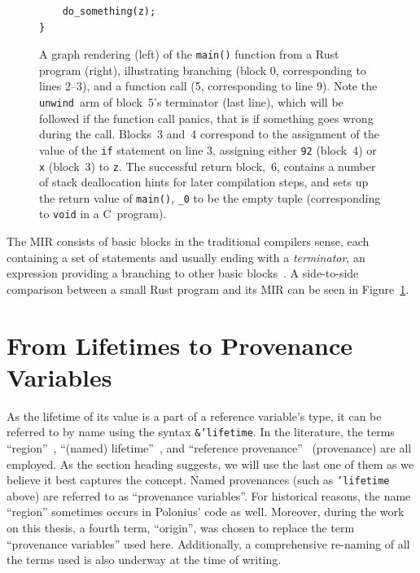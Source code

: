 \documentclass[11pt,a4paper,twoside,openany,draft]{report}
\newenvironment{sourcecode}{\captionsetup{type=listing}}{}
\newcommand{\InRust}[1]{\texttt{#1}}
\begin{document}
\begin{figure}
\begin{minipage}{.5\textwidth}
\begin{sourcecode}
\begin{verbatim}
    do_something(z);
}
\end{verbatim}
\end{sourcecode}
\end{minipage}
\caption[MIR of a Small Rust Program With Function Call]{A graph rendering
  (left) of the \InRust{main()} function from a Rust program (right),
  illustrating branching (block 0, corresponding to lines 2--3), and a function
  call (5, corresponding to line 9). Note the \texttt{unwind}~arm of block~5's
  terminator (last line), which will be followed if the function call panics,
  that is if something goes wrong during the call. Blocks~3 and~4 correspond to
  the assignment of the value of the \InRust{if} statement on line 3, assigning
  either \InRust{92} (block~4) or \InRust{x} (block~3) to \InRust{z}. The
  successful return block,~6, contains a number of stack deallocation hints for
  later compilation steps, and sets up the return value of \InRust{main()},
  \InRust{_0} to be the empty tuple (corresponding to \texttt{void} in a
  C~program).}
  \label{fig:mir-example}
\end{figure}

The MIR consists of basic blocks in the traditional compilers sense, each
containing a set of statements and usually ending with a \emph{terminator}, an
expression providing a branching to other basic blocks~\cite{mir_rfc}. A
side-to-side comparison between a small Rust program and its MIR can be seen in
Figure~\ref{fig:mir-example}.

\section{From Lifetimes to Provenance Variables}
\label{sec:reference-provenance}

As the lifetime of its value is a part of a reference variable's type, it can be
referred to by name using the syntax \InRust{&'lifetime}. In the literature, the
terms ``region''~\cite{matsakis_alias-based_2018}, ``(named)
lifetime''~\nocite{noauthor_rfc_2019}, and ``reference
provenance''~\cite{weiss_oxide:_2019} (provenance) are all employed. As the
section heading suggests, we will use the last one of them as we believe it best
captures the concept. Named provenances (such as \InRust{'lifetime} above) are
referred to as ``provenance variables''. For historical reasons, the name
``region'' sometimes occurs in Polonius' code as well. Moreover, during the work
on this thesis, a fourth term, ``origin'', was chosen to replace the term
``provenance variables'' used here. Additionally, a comprehensive re-naming of
all the terms used is also underway at the time of writing.
\end{document}

